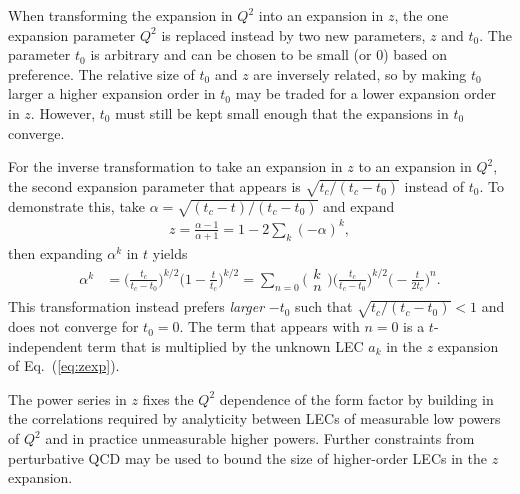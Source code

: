 When transforming the expansion in $Q^2$ into an expansion in $z$,
 the one expansion parameter $Q^2$ is replaced instead by two new parameters, $z$ and $t_0$.
The parameter $t_0$ is arbitrary and can be chosen to be small (or 0) based on preference.
The relative size of $t_0$ and $z$ are inversely related,
 so by making $t_0$ larger a higher expansion order in $t_0$
 may be traded for a lower expansion order in $z$.
However, $t_0$ must still be kept small enough that the expansions in $t_0$ converge.

For the inverse transformation to take an expansion in $z$ to an expansion in $Q^2$,
 the second expansion parameter that appears is $\sqrt{t_c/(t_c-t_0)}$ instead of $t_0$.
To demonstrate this, take $\alpha=\sqrt{(t_c-t)/(t_c-t_0)}$ and expand
\begin{align}
 z = \frac{\alpha-1}{\alpha+1} = 1 - 2 \sum_k (-\alpha)^k,
\end{align}
 then expanding $\alpha^k$ in $t$ yields
\begin{align}
 \alpha^k &= \biggr(\frac{ t_c}{ t_c -t_0} \biggr)^{k/2} \biggr( 1 -\frac{t}{t_c} \biggr)^{k/2}
 = \sum_{n=0} \biggr(\begin{array}{c} k \\ n \end{array} \biggr)
 \biggr(\frac{ t_c}{ t_c -t_0} \biggr)^{k/2} \biggr( -\frac{t}{2t_c} \biggr)^{n}.
\end{align}
This transformation instead prefers \emph{larger} $-t_0$ such that
 $\sqrt{t_c/(t_c-t_0)}<1$ and does not converge for $t_0=0$.
The term that appears with $n=0$ is a $t$-independent term that is multiplied by
 the unknown LEC $a_k$ in the $z$ expansion of Eq.~(\ref{eq:zexp}).

The power series in $z$ fixes the $Q^2$ dependence of the form factor
 by building in the correlations required by analyticity
 between LECs of measurable low powers of $Q^2$
 and in practice unmeasurable higher powers.
Further constraints from perturbative QCD may be used to bound the size of higher-order LECs
 in the $z$ expansion.
